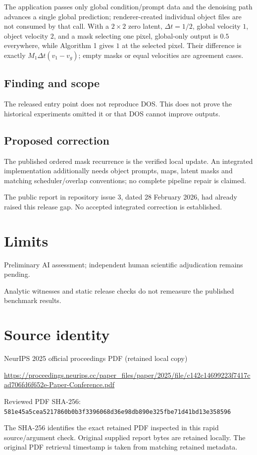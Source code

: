 \documentclass[11pt]{article}
\begin{document}
The application passes only global condition/prompt data and the denoising path advances a single global prediction; renderer-created individual object files are not consumed by that call. With a \(2\times2\) zero latent, \(\Delta t=1/2\), global velocity \(1\), object velocity \(2\), and a mask selecting one pixel, global-only output is \(0.5\) everywhere, while Algorithm 1 gives \(1\) at the selected pixel. Their difference is exactly \(M_1\Delta t(v_1-v_g)\); empty masks or equal velocities are agreement cases.

\subsection*{Finding and scope}

The released entry point does not reproduce DOS. This does not prove the historical experiments omitted it or that DOS cannot improve outputs.

\subsection*{Proposed correction}

The published ordered mask recurrence is the verified local update. An integrated implementation additionally needs object prompts, maps, latent masks and matching scheduler/overlap conventions; no complete pipeline repair is claimed.

The public report in repository issue 3, dated 28 February 2026, had already raised this release gap. No accepted integrated correction is established.

\section*{Limits}

Preliminary AI assessment; independent human scientific adjudication remains pending.\par

Analytic witnesses and static release checks do not remeasure the published benchmark results.\par

\section*{Source identity}

NeurIPS 2025 official proceedings PDF (retained local copy)

\url{https://proceedings.neurips.cc/paper_files/paper/2025/file/c142c14699223f7417cad706fd6f652e-Paper-Conference.pdf}

Reviewed PDF SHA-256: \nolinkurl{581e45a5cea5217860b0b3f3396068d36e98db890e325fbe71d41bd13e358596}

The SHA-256 identifies the exact retained PDF inspected in this rapid source/argument check. Original supplied report bytes are retained locally. The original PDF retrieval timestamp is taken from matching retained metadata.
\end{document}

